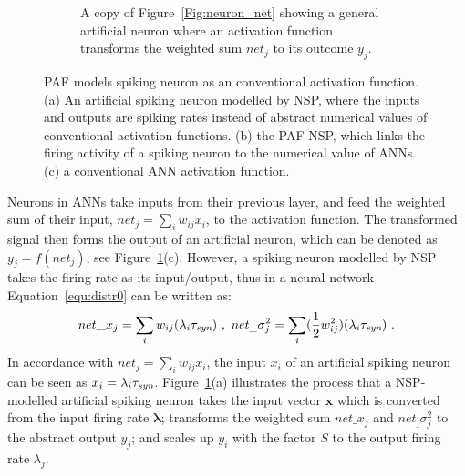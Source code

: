 \begin{figure}[tbh!]
\begin{subfigure}[t]{\textwidth}
			\bigskip
			\caption{A copy of Figure~\ref{Fig:neuron_net} showing a general artificial neuron where an activation function transforms the weighted sum $net_j$  to its outcome $y_j$.}
		\end{subfigure}
		\caption[PAF models spiking neuron as an conventional activation function.]{PAF models spiking neuron as an conventional activation function.
		(a) An artificial spiking neuron modelled by NSP, where the inputs and outputs are spiking rates instead of abstract numerical values of conventional activation functions.
		(b) the PAF-NSP, which links the firing activity of a spiking neuron to the numerical value of ANNs.
		(c) a conventional ANN activation function.}
		\label{Fig:tneuron}
	\end{figure}
	
	
	
	Neurons in ANNs take inputs from their previous layer, and feed the weighted sum of their input, $net_j = \sum_i w_{ij}x_i$, to the activation function.
	The transformed signal then forms the output of an artificial neuron, which can be denoted as $y_j=f(net_j)$, see Figure~\ref{Fig:tneuron}(c).
	However, a spiking neuron modelled by NSP takes the firing rate as its input/output, thus in a neural network Equation~\ref{equ:distr0} can be written as:
	\begin{equation}
	net\_x_{j} = \sum_i w_{ij}(\lambda_{i}\tau_{\textit{\textrm{syn}}})~,
	~net_\_\sigma^2_j= \sum_i (\frac{1}{2} w_{ij}^2)(\lambda_{i}\tau_{\textit{\textrm{syn}}})~.
	\label{equ:mi_input}
	\end{equation}
	In accordance with $net_j = \sum_i w_{ij}x_i$, the input $ x_i $ of an artificial spiking neuron can be seen as $x_i=\lambda_{i}\tau_{\textit{\textrm{syn}}}$.
	Figure~\ref{Fig:tneuron}(a) illustrates the process that a NSP-modelled artificial spiking neuron takes the input vector $\mathbf{x}$ which is converted from the input firing rate $\bm{\lambda}$; transforms the weighted sum $net\_x_{j}$ and $net_\_\sigma^2_j$ to the abstract output $y_j$; and scales up $y_i$ with the factor $S$ to the output firing rate $\lambda_j$. 
	
